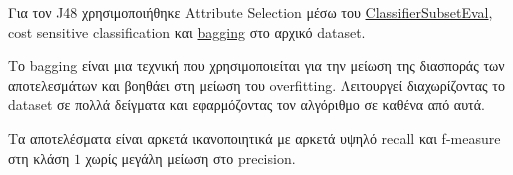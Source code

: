 Για τον J48 χρησιμοποιήθηκε Attribute Selection μέσω του
\href{http://weka.sourceforge.net/doc.stable/weka/attributeSelection/ClassifierSubsetEval.html}{ClassifierSubsetEval},
cost sensitive classification και
\href{https://en.wikipedia.org/wiki/Bootstrap_aggregating}{bagging}
στο αρχικό dataset.

Το bagging είναι μια τεχνική που χρησιμοποιείται για την μείωση της διασποράς των αποτελεσμάτων και βοηθάει στη μείωση του overfitting.
Λειτουργεί διαχωρίζοντας το dataset σε πολλά δείγματα και εφαρμόζοντας τον αλγόριθμο σε καθένα από αυτά.

Τα αποτελέσματα είναι αρκετά ικανοποιητικά με αρκετά υψηλό recall και f-measure στη κλάση $1$ χωρίς μεγάλη μείωση στο precision.

